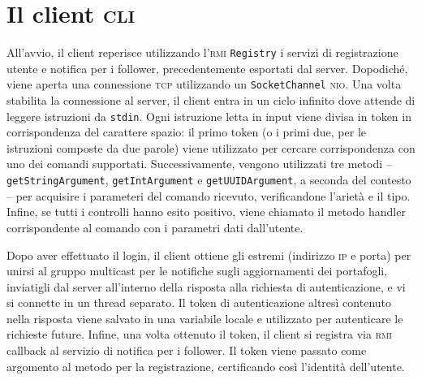 \documentclass[a4paper,8pt]{article} %
\def\code#1{\texttt{#1}}
\begin{document}
\section{Il client \textsc{cli}}
All'avvio, il client reperisce utilizzando l'\textsc{rmi} \code{Registry} i servizi di registrazione utente e notifica per i follower, precedentemente esportati dal server.
Dopodiché, viene aperta una connessione \textsc{tcp} utilizzando un \code{SocketChannel} \textsc{nio}. Una volta stabilita la connessione al server, il client entra in un ciclo infinito
dove attende di leggere istruzioni da \code{stdin}. Ogni istruzione letta in input viene divisa in token in corrispondenza del carattere spazio: il primo token (o i primi due,
per le istruzioni composte da due parole) viene utilizzato per cercare corrispondenza con uno dei comandi supportati. Successivamente, vengono utilizzati tre metodi -- \code{getStringArgument},
\code{getIntArgument} e \code{getUUIDArgument}, a seconda del contesto -- per acquisire i parameteri del comando ricevuto, verificandone l'arietà e il tipo. Infine, se tutti i controlli hanno
esito positivo, viene chiamato il metodo handler corrispondente al comando con i parametri dati dall'utente.
\par Dopo aver effettuato il login, il client ottiene gli estremi (indirizzo \textsc{ip} e porta) per unirsi al gruppo multicast per le notifiche sugli aggiornamenti dei portafogli, inviatigli dal server
all'interno della risposta alla richiesta di autenticazione, e vi si connette in un thread separato. Il token di autenticazione altresì contenuto nella risposta viene salvato in una variabile locale e utilizzato per autenticare le richieste future.
Infine, una volta ottenuto il token, il client si registra via \textsc{rmi} callback al servizio di notifica per i follower. Il token viene passato come argomento al metodo per la registrazione, certificando così l'identità dell'utente.
\end{document}

